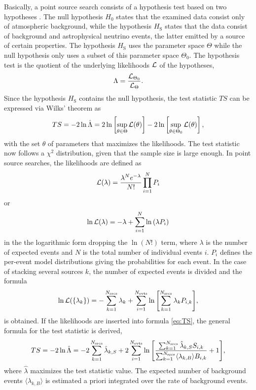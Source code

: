 Basically, a point source search consists of a hypothesis test based on two hypotheses \cite{likelihood_method}.
The null hypothesis $H_0$ states that the examined data consist only of atmospheric background, while the hypothesis $H_\text{S}$ states that the data consist of background and astrophysical neutrino events, the latter emitted by a source of certain properties.
The hypothesis $H_\text{S}$ uses the parameter space $\Theta$ while the null hypothesis only uses a subset of this parameter space $\Theta_0$.
The hypothesis test is the quotient of the underlying likelihoods $\mathcal{L}$ of the hypotheses,
\begin{equation}
  \Lambda = \frac{\mathcal{L}_{\Theta_0}}{\mathcal{L}_\Theta}.
\end{equation}
Since the hypothesis $H_\text{S}$ contains the null hypothesis, the test statistic $TS$ can be expressed via Wilks' theorem \cite{wilk} as
\begin{equation}
  TS = -2\ln\hat{\Lambda} = 2\ln\left[ \sup_{\theta\in\Theta}\mathcal{L}(\theta) \right] - 2\ln\left[ \sup_{\theta\in\Theta_0}\mathcal{L}(\theta) \right], \label{eq:TS}
\end{equation}
with the set $\theta$ of parameters that maximizes the likelihoods.
The test statistic now follows a $\chi^2$ distribution, given that the sample size is large enough.
In point source searches, the likelihoods are defined as
\begin{equation}
  \mathcal{L}(\lambda) = \frac{\lambda^Ne^{-\lambda}}{N!}\prod^N_{i=1}P_i
\end{equation}
or
\begin{equation}
  \ln\mathcal{L}(\lambda) = -\lambda + \sum^N_{i=1}\ln{(\lambda P_i)}
\end{equation}
in the the logarithmic form \cite{ex_likelihood} dropping the $\ln(N!)$ term, where $\lambda$ is the number of expected events and $N$ is the total number of individual events $i$.
$P_i$ defines the per-event model distributions giving the probabilities for each event.
In the case of stacking several sources $k$, the number of expected events is divided and the formula
\begin{equation}
  \ln\mathcal{L}(\{\lambda_k\}) = -\sum^{N_\text{srcs}}_{k=1}\lambda_k + \sum^{N_\text{evts}}_{i=1}\ln{\left[ \sum^{N_\text{srcs}}_{k=1}\lambda_k P_{i,k} \right]},
\end{equation}
is obtained.
If the likelihoods are inserted into formula \eqref{eq:TS}, the general formula for the test statistic is derived,
\begin{equation}
    TS = -2\ln{\hat\Lambda} = -2\sum_{k=1}^{N_{\text{srcs}}}\hat\lambda_{k,S} + 2\sum_{i=1}^{N_{\text{evts}}}\ln{\left[ \frac{\sum_{k=1}^{N_{\text{srcs}}}\hat\lambda_{k,S}S_{i,k}}{\sum_{k=1}^{N_{\text{srcs}}}\langle\lambda_{k,B}\rangle B_{i,k}}+1 \right]}, \label{eq:TS_general}
\end{equation}
where $\hat\lambda$ maximizes the test statistic value.
The expected number of background events $\langle\lambda_{k,B}\rangle$ is estimated a priori integrated over the rate of background events.

